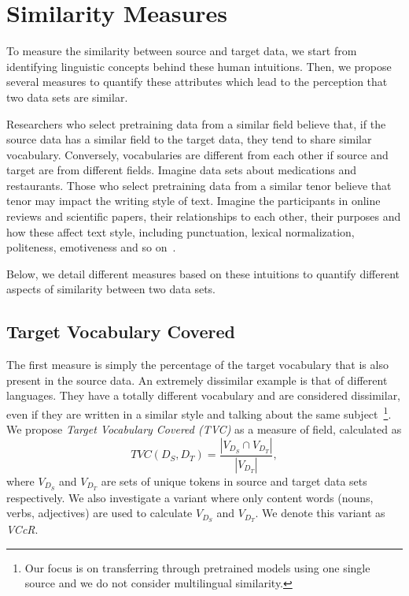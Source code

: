 \documentclass[11pt,a4paper]{article}
\begin{document}
\section{Similarity Measures}
To measure the similarity between source and target data, we start from identifying linguistic concepts behind these human intuitions. 
Then, we propose several measures to quantify these attributes which lead to the perception that two data sets are similar. 

Researchers who select pretraining data from a similar field believe that, if the source data has a similar field to the target data, they tend to share similar vocabulary. 
Conversely, vocabularies are different from each other if source and target are from different fields. 
Imagine data sets about medications and restaurants. 
Those who select pretraining data from a similar tenor believe that tenor may impact the writing style of text. 
Imagine the participants in online reviews and scientific papers, their relationships to each other, their purposes and how these affect text style, including punctuation, lexical normalization, politeness, emotiveness and so on~\citep{Lee:LLT:2001,Solano:TCR:2006,Pavlick:Tetreault:TACL:2016}.

Below, we detail different measures based on these intuitions to quantify different aspects of similarity between two data sets.

\subsection{Target Vocabulary Covered}
The first measure is simply the percentage of the target vocabulary that is also present in the source data.
An extremely dissimilar example is that of different languages. 
They have a totally different vocabulary and are considered dissimilar, even if they are written in a similar style and talking about the same subject~\footnote{Our focus is on transferring through pretrained models using one single source and we do not consider multilingual similarity.}.
We propose \emph{Target Vocabulary Covered (TVC)} as a measure of field, calculated as
\[
TVC (D_S, D_T) = \frac{|V_{D_S} \cap V_{D_T}|}{|V_{D_T}|},
\]
where $V_{D_S}$ and $V_{D_T}$ are sets of unique tokens in source and target data sets respectively. 
We also investigate a variant where only content words (nouns, verbs, adjectives) are used to calculate $V_{D_S}$ and $V_{D_T}$. 
We denote this variant as \emph{VCcR}.
\end{document}
